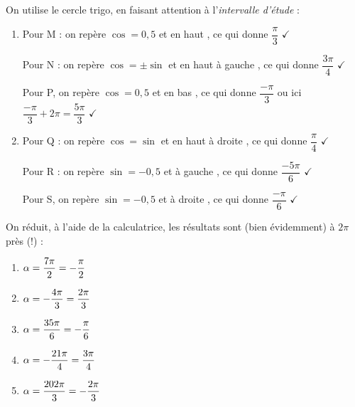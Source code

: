 \documentclass[a4paper,11pt]{article}
\begin{document}

\medskip

On utilise le cercle trigo, en faisant attention à l'\textit{intervalle d'étude} :

\begin{enumerate}
	\item Pour M : on repère \og $\cos=0,5$ et en haut \fg, ce qui donne $\dfrac{\pi}{3}$ $\checkmark$
	
	Pour N : on repère \og $\cos=\pm\sin$ et en haut à gauche \fg, ce qui donne $\dfrac{3\pi}{4}$ $\checkmark$
	
	Pour P, on repère \og $\cos=0,5$ et en bas \fg, ce qui donne $\dfrac{-\pi}{3}$ ou ici $\dfrac{-\pi}{3}+2\pi=\dfrac{5\pi}{3}$ $\checkmark$
	\item Pour Q : on repère \og $\cos=\sin$ et en haut à droite \fg, ce qui donne $\dfrac{\pi}{4}$ $\checkmark$
	
	Pour R : on repère \og $\sin=-0,5$ et à gauche \fg, ce qui donne $\dfrac{-5\pi}{6}$ $\checkmark$
	
	Pour S, on repère \og $\sin=-0,5$ et à droite \fg, ce qui donne $\dfrac{-\pi}{6}$ $\checkmark$
\end{enumerate}

\medskip


\medskip

On réduit, à l'aide de la calculatrice, les résultats sont (bien évidemment) à $2\pi$ près (!) :
\begin{multicols}{3}
	\begin{enumerate}
		\item $\alpha=\dfrac{7\pi}{2}=-\dfrac{\pi}{2}$
		\item $\alpha=-\dfrac{4\pi}{3}=\dfrac{2\pi}{3}$
		\item $\alpha=\dfrac{35\pi}{6}=-\dfrac{\pi}{6}$
		\item $\alpha=-\dfrac{21\pi}{4}=\dfrac{3\pi}{4}$
		\item $\alpha=\dfrac{202\pi}{3}=-\dfrac{2\pi}{3}$
	\end{enumerate}
\end{multicols}

\newpage


\newcommand\ractd{\dfrac{\sqrt{3}}{2}}
\newcommand\ud{\dfrac{1}{2}}
\newcommand\racdd{\dfrac{\sqrt{2}}{2}}
\newcommand\angmpcossin[5][]{%
	\tabto{2cm}$\Rightarrow MP=#1\angl{#2}{#3}$ \tabto{4.5cm}et donc $\cos(\alpha)=#4$ \tabto{8.5cm}et $\sin(\alpha)=#5$
}
\end{document}
